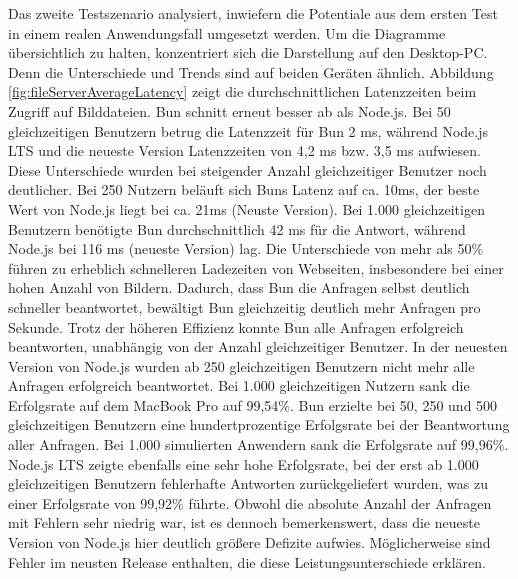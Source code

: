\noindent
Das zweite Testszenario analysiert, inwiefern die Potentiale aus dem ersten Test in einem realen Anwendungsfall umgesetzt werden. Um die Diagramme übersichtlich zu halten, konzentriert sich die Darstellung auf den Desktop-PC. Denn die Unterschiede und Trends sind auf beiden Geräten ähnlich. Abbildung \ref{fig:fileServerAverageLatency} zeigt die durchschnittlichen Latenzzeiten beim Zugriff auf Bilddateien. Bun schnitt erneut besser ab als Node.js. Bei 50 gleichzeitigen Benutzern betrug die Latenzzeit für Bun 2 ms, während Node.js LTS und die neueste Version Latenzzeiten von 4,2 ms bzw. 3,5 ms aufwiesen. Diese Unterschiede wurden bei steigender Anzahl gleichzeitiger Benutzer noch deutlicher. Bei 250 Nutzern beläuft sich Buns Latenz auf ca. 10ms, der beste Wert von Node.js liegt bei ca. 21ms (Neuste Version). Bei 1.000 gleichzeitigen Benutzern benötigte Bun durchschnittlich 42 ms für die Antwort, während Node.js bei 116 ms (neueste Version) lag. Die Unterschiede von mehr als 50\% führen zu erheblich schnelleren Ladezeiten von Webseiten, insbesondere bei einer hohen Anzahl von Bildern. Dadurch, dass Bun die Anfragen selbst deutlich schneller beantwortet, bewältigt Bun gleichzeitig deutlich mehr Anfragen pro Sekunde. Trotz der höheren Effizienz konnte Bun alle Anfragen erfolgreich beantworten, unabhängig von der Anzahl gleichzeitiger Benutzer. In der neuesten Version von Node.js wurden ab 250 gleichzeitigen Benutzern nicht mehr alle Anfragen erfolgreich beantwortet. Bei 1.000 gleichzeitigen Nutzern sank die Erfolgsrate auf dem MacBook Pro auf 99,54\%. Bun erzielte bei 50, 250 und 500 gleichzeitigen Benutzern eine hundertprozentige Erfolgsrate bei der Beantwortung aller Anfragen. Bei 1.000 simulierten Anwendern sank die Erfolgsrate auf 99,96\%. Node.js LTS zeigte ebenfalls eine sehr hohe Erfolgsrate, bei der erst ab 1.000 gleichzeitigen Benutzern fehlerhafte Antworten zurückgeliefert wurden, was zu einer Erfolgsrate von 99,92\% führte. Obwohl die absolute Anzahl der Anfragen mit Fehlern sehr niedrig war, ist es dennoch bemerkenswert, dass die neueste Version von Node.js hier deutlich größere Defizite aufwies. Möglicherweise sind Fehler im neusten Release enthalten, die diese Leistungsunterschiede erklären.\\

